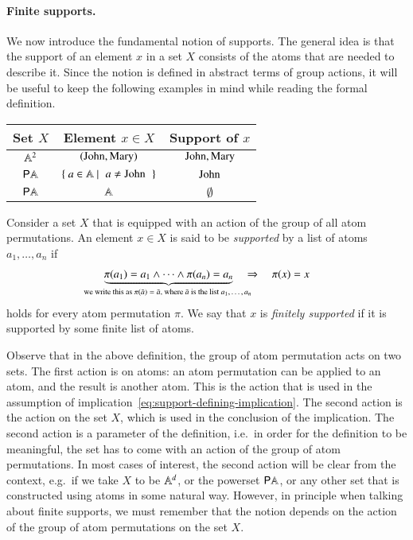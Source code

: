 \paragraph*{Finite supports.}
We now introduce the fundamental notion of supports. The general idea is that the support of an  element $x$ in a set $X$ consists of  the atoms that are needed to describe it. Since the notion is defined in abstract terms of group actions, it will be useful to keep the following examples in mind while reading the formal definition.

\begin{center}
    \begin{tabular}{c|c|c}
        Set $X$ & Element $x \in X$ & Support of $x$\\
        \hline
        $\mathbb A^2$ & $(\text{John},\text{Mary})$ & $\text{John},\text{Mary}$\\
        ${\mathsf P} \mathbb A$ & \quad  $\setbuild{a \in \atoms}{$a \neq \john$}$ \quad & $\text{John}$\\
        ${\mathsf P} \mathbb A$ & $\mathbb A$ & $\emptyset$
    \end{tabular}
\end{center}


\begin{definition}[Supports]\label{def:supports-equality}
    Consider a set $X$ that is equipped with an action of the group of all  atom permutations. An element $x \in X$ is said to be \emph{supported} by  a list of  atoms $a_1,\ldots,a_n$ if 
    \begin{align}\label{eq:support-defining-implication}
    \myunderbrace{\pi(a_1)=a_1 \land \cdots \land \pi(a_n)=a_n}{we write this as $\pi(\bar a)= \bar a$, where $\bar a$ is the list $a_1,\ldots,a_n$}  
    \quad \Rightarrow \quad 
    \pi(x) = x
    \end{align}
    holds for every atom permutation $\pi$. We say that $x$ is \emph{finitely supported} if it is supported by some finite list of atoms.
\end{definition}

Observe that in the above definition, the group of atom permutation acts on two sets. The first action is on atoms: an atom permutation can be applied to an atom, and the result is another atom. This is the action that is used in the assumption of implication~\eqref{eq:support-defining-implication}. The second action is the action on the set $X$, which is used in the conclusion of the implication. The second action is a parameter of the definition, i.e.~in order for the definition to be meaningful, the set has to come with an action of the group of atom permutations. In most cases of interest, the second action will be clear from the context, e.g.~if we take $X$ to be $\mathbb A^d$, or the powerset ${\mathsf P} \mathbb A$, or any other set that is constructed using atoms in some natural way. However, in principle when talking about finite supports, we must remember that the notion depends on the action of the group of atom permutations on the set $X$.

